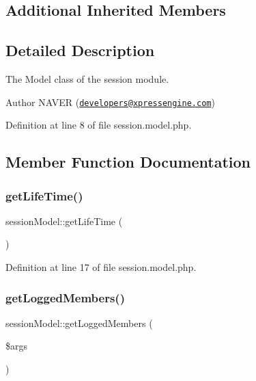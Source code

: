 \subsection*{Additional Inherited Members}


\subsection{Detailed Description}
The Model class of the session module. 

\begin{DoxyAuthor}{Author}
N\+A\+V\+ER (\href{mailto:developers@xpressengine.com}{\tt developers@xpressengine.\+com}) 
\end{DoxyAuthor}


Definition at line 8 of file session.\+model.\+php.



\subsection{Member Function Documentation}
\mbox{\label{classsessionModel_a3c6de96ddf005e54fd486754acb4c28a}} 
\subsubsection{\texorpdfstring{get\+Life\+Time()}{getLifeTime()}}
{\footnotesize\ttfamily session\+Model\+::get\+Life\+Time (\begin{DoxyParamCaption}{ }\end{DoxyParamCaption})}



Definition at line 17 of file session.\+model.\+php.

\mbox{\label{classsessionModel_ab6fda0dcadba97f36ceb3be8c207cadc}} 
\subsubsection{\texorpdfstring{get\+Logged\+Members()}{getLoggedMembers()}}
{\footnotesize\ttfamily session\+Model\+::get\+Logged\+Members (\begin{DoxyParamCaption}\item[{}]{\$args }\end{DoxyParamCaption})}



